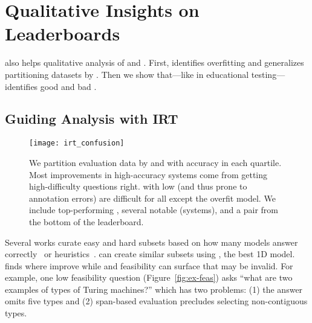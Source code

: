 \section{Qualitative Insights on Leaderboards}
\label{ch:isicle:interp}

\name{} also helps qualitative analysis of \itms{} and \subjs{}.
First, \irt{} identifies overfitting and generalizes partitioning datasets by \diff{}.
Then we show that---like in educational testing---\irt{} identifies good and bad \itms{}.

\subsection{Guiding Analysis with IRT}

\begin{figure*}[t]
    \centering
    \texttt{[image: irt\_confusion]}
    \caption{
        We partition evaluation data by \irt{} \diff{} and
        \discability{} with accuracy in each quartile.
        Most improvements in high-accuracy systems come from getting
        high-difficulty questions right.
        \Itms{} with low \discability{} (and thus prone to annotation errors) are difficult for all \subjs{} except the overfit  model.
        We include top-performing \squad{} \subjs{}, several notable
        \subjs{} (systems), and a pair from the bottom of the leaderboard.
    }
    \label{fig:confusion}
\end{figure*}

Several works curate easy and hard  subsets based on how many
models answer correctly~\citep{Rondeau2018-um} or
heuristics~\citep{sugawara2018easier}.
\irt{} can create similar subsets using , the best 1D model.
\Diff{} finds where \subjs{} improve while \discability{} and
feasibility can surface \itms{} that may be invalid.
For example, one low feasibility question (Figure~\ref{fig:ex-feas}) asks
``what are two examples of types of Turing machines?'' which has two
problems: (1) the answer omits five types and (2) span-based
evaluation precludes selecting non-contiguous types.

